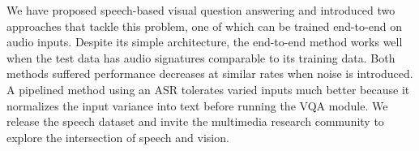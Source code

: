 \documentclass[letterpaper]{article} %
\begin{document}
We have proposed speech-based visual question answering and introduced two approaches that tackle this problem, one of which can be trained end-to-end on audio inputs. Despite its simple architecture, the end-to-end method works well when the test data has audio signatures comparable to its training data. Both methods suffered performance decreases at similar rates when noise is introduced. A pipelined method using an ASR tolerates varied inputs much better because it normalizes the input variance into text before running the VQA module. We release the speech dataset and invite the multimedia research community to explore the intersection of speech and vision.

\newpage

 
\end{document}
